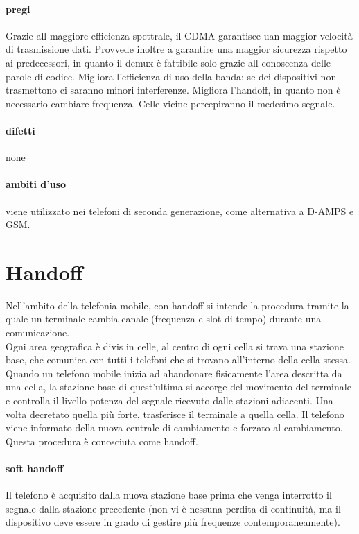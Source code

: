 \documentclass{article}
\begin{document}
\paragraph{pregi} Grazie all maggiore efficienza spettrale, il CDMA garantisce
uan maggior velocità di trasmissione dati. Provvede inoltre a garantire una
maggior sicurezza rispetto ai predecessori, in quanto il demux è fattibile solo
grazie all conoscenza delle parole di codice.
Migliora l'efficienza di uso della banda: se dei dispositivi non trasmettono ci
saranno minori interferenze. Migliora l'handoff, in quanto non è necessario
cambiare frequenza. Celle vicine percepiranno il medesimo segnale.

\paragraph{difetti} none

\paragraph{ambiti d'uso} viene utilizzato nei telefoni di seconda generazione,
come alternativa a D-AMPS e GSM.

\section{Handoff}
Nell'ambito della telefonia mobile, con handoff si intende la procedura tramite
la quale un terminale cambia canale (frequenza e slot di tempo) durante una
comunicazione.\\
Ogni area geografica è divis in celle, al centro di ogni cella si trava una
stazione base, che comunica con tutti i telefoni che si trovano all'interno
della cella stessa. Quando un telefono mobile inizia ad abandonare fisicamente
l'area descritta da una cella, la stazione base di quest'ultima si accorge del
movimento del terminale e controlla il livello potenza del segnale ricevuto
dalle stazioni adiacenti. Una volta decretato quella più forte, trasferisce il
terminale a quella cella. Il telefono viene informato della nuova centrale di
cambiamento e forzato al cambiamento. Questa procedura è conosciuta come
handoff.

\paragraph{soft handoff} Il telefono è acquisito dalla nuova stazione base prima
che venga interrotto il segnale dalla stazione precedente (non vi è nessuna
perdita di continuità, ma il dispositivo deve essere in grado di gestire più
frequenze contemporaneamente).
\end{document}
